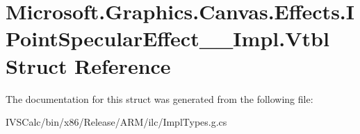 \hypertarget{struct_microsoft_1_1_graphics_1_1_canvas_1_1_effects_1_1_i_point_specular_effect_____impl_1_1_vtbl}{}\section{Microsoft.\+Graphics.\+Canvas.\+Effects.\+I\+Point\+Specular\+Effect\+\_\+\+\_\+\+Impl.\+Vtbl Struct Reference}
\label{struct_microsoft_1_1_graphics_1_1_canvas_1_1_effects_1_1_i_point_specular_effect_____impl_1_1_vtbl}


The documentation for this struct was generated from the following file\+:\begin{DoxyCompactItemize}
\item 
I\+V\+S\+Calc/bin/x86/\+Release/\+A\+R\+M/ilc/Impl\+Types.\+g.\+cs\end{DoxyCompactItemize}
